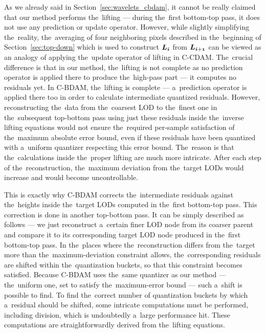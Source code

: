 As we already said in Section~\ref{sec:wavelets_cbdam}, it cannot be really claimed that our method performs the~lifting --- during the~first bottom-top pass, it does not use any prediction or update operator. However, while slightly simplifying the~reality, the~averaging of four neighboring pixels described in the~beginning of Section~\ref{sec:top-down} which is used to construct $\lnorm{i}$ from $\lnorm{i+1}$ can be viewed as an analogy of applying the~update operator of lifting in C-CDAM. The~crucial difference is that in our method, the~lifting is not complete as no prediction operator is applied there to produce the~high-pass part --- it computes no residuals yet. In C-BDAM, the~lifting is complete --- a~prediction operator is applied there too in order to calculate intermediate quantized residuals. However, reconstructing the~data from the~coarsest LOD to the~finest one in the~subsequent top-bottom pass using just these residuals inside the~inverse lifting equations would not ensure the~required per-sample satisfaction of the~maximum absolute error bound, even if these residuals have been quantized with a~uniform quantizer respecting this error bound. The~reason is that the~calculations inside the~proper lifting are much more intricate. After each step of the~reconstruction, the~maximum deviation from the~target LODs would increase and would become uncontrollable. 

This is exactly why C-BDAM corrects the~intermediate residuals against the~heights inside the~target LODs computed in the~first bottom-top pass. This correction is done in another top-bottom pass. It can be simply described as follows --- we just reconstruct a~certain finer LOD node from its coarser parent and compare it to its corresponding target LOD node produced in the~first bottom-top pass. In the~places where the~reconstruction differs from the~target more than the~maximum-deviation constraint allows, the~corresponding residuals are shifted within the~quantization buckets, so that this constraint becomes satisfied. Because C-BDAM uses the~same quantizer as our method --- the~uniform one, set to satisfy the~maximum-error bound --- such a~shift is possible to find. To find the~correct number of quantization buckets by which a~residual should be shifted, some intricate computations must be performed, including division, which is undoubtedly a~large performance hit. These computations are straightforwardly derived from the~lifting equations.

